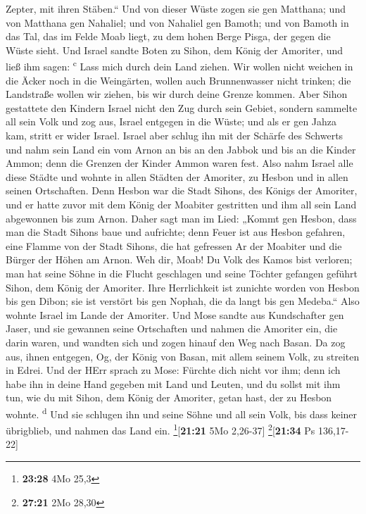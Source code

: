 Zepter, mit ihren Stäben.`` Und von dieser Wüste zogen sie gen Matthana;
 und von Matthana gen Nahaliel; und von Nahaliel gen
Bamoth;  und von Bamoth in das Tal, das im Felde Moab
liegt, zu dem hohen Berge Pisga, der gegen die Wüste sieht.
 Und Israel sandte Boten zu Sihon, dem König der
Amoriter, und ließ ihm sagen: \textsuperscript{c}  Lass
mich durch dein Land ziehen. Wir wollen nicht weichen in die Äcker noch
in die Weingärten, wollen auch Brunnenwasser nicht trinken; die
Landstraße wollen wir ziehen, bis wir durch deine Grenze kommen.
 Aber Sihon gestattete den Kindern Israel nicht den Zug
durch sein Gebiet, sondern sammelte all sein Volk und zog aus, Israel
entgegen in die Wüste; und als er gen Jahza kam, stritt er wider Israel.
 Israel aber schlug ihn mit der Schärfe des Schwerts und
nahm sein Land ein vom Arnon an bis an den Jabbok und bis an die Kinder
Ammon; denn die Grenzen der Kinder Ammon waren fest. 
Also nahm Israel alle diese Städte und wohnte in allen Städten der
Amoriter, zu Hesbon und in allen seinen Ortschaften. 
Denn Hesbon war die Stadt Sihons, des Königs der Amoriter, und er hatte
zuvor mit dem König der Moabiter gestritten und ihm all sein Land
abgewonnen bis zum Arnon.  Daher sagt man im Lied: „Kommt
gen Hesbon, dass man die Stadt Sihons baue und aufrichte;
 denn Feuer ist aus Hesbon gefahren, eine Flamme von der
Stadt Sihons, die hat gefressen Ar der Moabiter und die Bürger der Höhen
am Arnon.  Weh dir, Moab! Du Volk des Kamos bist
verloren; man hat seine Söhne in die Flucht geschlagen und seine Töchter
gefangen geführt Sihon, dem König der Amoriter.  Ihre
Herrlichkeit ist zunichte worden von Hesbon bis gen Dibon; sie ist
verstört bis gen Nophah, die da langt bis gen Medeba.`` 
Also wohnte Israel im Lande der Amoriter.  Und Mose
sandte aus Kundschafter gen Jaser, und sie gewannen seine Ortschaften
und nahmen die Amoriter ein, die darin waren,  und
wandten sich und zogen hinauf den Weg nach Basan. Da zog aus, ihnen
entgegen, Og, der König von Basan, mit allem seinem Volk, zu streiten in
Edrei.  Und der HErr sprach zu Mose: Fürchte dich nicht
vor ihm; denn ich habe ihn in deine Hand gegeben mit Land und Leuten,
und du sollst mit ihm tun, wie du mit Sihon, dem König der Amoriter,
getan hast, der zu Hesbon wohnte. \textsuperscript{d} 
Und sie schlugen ihn und seine Söhne und all sein Volk, bis dass keiner
übrigblieb, und nahmen das Land ein. \footnote{\textbf{23:28} 4Mo 25,3}{[}\textbf{21:21}
5Mo 2,26-37{]} \footnote{\textbf{27:21} 2Mo 28,30}{[}\textbf{21:34} Ps
136,17-22{]}

